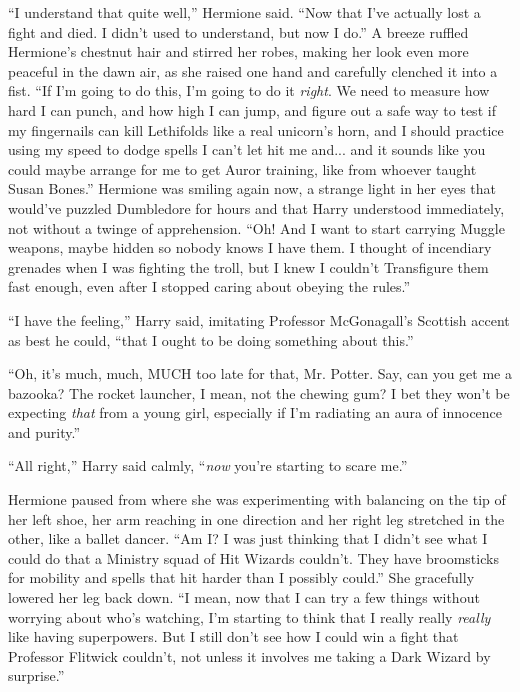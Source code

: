 ``I understand that quite well,'' Hermione said. ``Now that I've actually lost a fight and died. I didn't used to understand, but now I do.'' A breeze ruffled Hermione's chestnut hair and stirred her robes, making her look even more peaceful in the dawn air, as she raised one hand and carefully clenched it into a fist. ``If I'm going to do this, I'm going to do it \emph{right}. We need to measure how hard I can punch, and how high I can jump, and figure out a safe way to test if my fingernails can kill Lethifolds like a real unicorn's horn, and I should practice using my speed to dodge spells I can't let hit me and... and it sounds like you could maybe arrange for me to get Auror training, like from whoever taught Susan Bones.'' Hermione was smiling again now, a strange light in her eyes that would've puzzled Dumbledore for hours and that Harry understood immediately, not without a twinge of apprehension. ``Oh! And I want to start carrying Muggle weapons, maybe hidden so nobody knows I have them. I thought of incendiary grenades when I was fighting the troll, but I knew I couldn't Transfigure them fast enough, even after I stopped caring about obeying the rules.''

``I have the feeling,'' Harry said, imitating Professor McGonagall's Scottish accent as best he could, ``that I ought to be doing something about this.''

``Oh, it's much, much, MUCH too late for that, Mr. Potter. Say, can you get me a bazooka? The rocket launcher, I mean, not the chewing gum? I bet they won't be expecting \emph{that} from a young girl, especially if I'm radiating an aura of innocence and purity.''

``All right,'' Harry said calmly, ``\emph{now} you're starting to scare me.''

Hermione paused from where she was experimenting with balancing on the tip of her left shoe, her arm reaching in one direction and her right leg stretched in the other, like a ballet dancer. ``Am I? I was just thinking that I didn't see what I could do that a Ministry squad of Hit Wizards couldn't. They have broomsticks for mobility and spells that hit harder than I possibly could.'' She gracefully lowered her leg back down. ``I mean, now that I can try a few things without worrying about who's watching, I'm starting to think that I really really \emph{really} like having superpowers. But I still don't see how I could win a fight that Professor Flitwick couldn't, not unless it involves me taking a Dark Wizard by surprise.''

